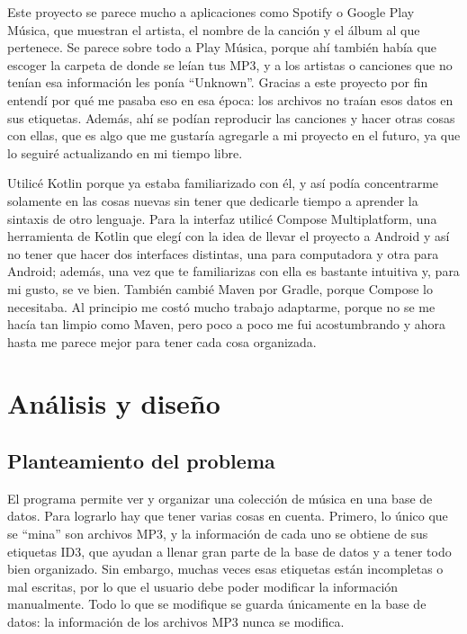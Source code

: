 \documentclass[12pt,letterpaper]{article}
\begin{document}
Este proyecto se parece mucho a aplicaciones como Spotify o Google Play
Música, que muestran el artista, el nombre de la canción y el álbum al que
pertenece. Se parece sobre todo a Play Música, porque ahí también había
que escoger la carpeta de donde se leían tus MP3, y a los artistas o
canciones que no tenían esa información les ponía ``Unknown''. Gracias a
este proyecto por fin entendí por qué me pasaba eso en esa época: los
archivos no traían esos datos en sus etiquetas. Además, ahí se podían
reproducir las canciones y hacer otras cosas con ellas, que es algo que me
gustaría agregarle a mi proyecto en el futuro, ya que lo seguiré
actualizando en mi tiempo libre.

Utilicé Kotlin porque ya estaba familiarizado con él, y así podía
concentrarme solamente en las cosas nuevas sin tener que dedicarle tiempo
a aprender la sintaxis de otro lenguaje. Para la interfaz utilicé Compose
Multiplatform, una herramienta de Kotlin que elegí con la idea de llevar
el proyecto a Android y así no tener que hacer dos interfaces distintas,
una para computadora y otra para Android; además, una vez que te
familiarizas con ella es bastante intuitiva y, para mi gusto, se ve bien.
También cambié Maven por Gradle, porque Compose lo necesitaba. Al
principio me costó mucho trabajo adaptarme, porque no se me hacía tan
limpio como Maven, pero poco a poco me fui acostumbrando y ahora hasta me
parece mejor para tener cada cosa organizada.

\section{Análisis y diseño}

\subsection{Planteamiento del problema}

El programa permite ver y organizar una colección de música en una base de
datos. Para lograrlo hay que tener varias cosas en cuenta. Primero, lo
único que se ``mina'' son archivos MP3, y la información de cada uno se
obtiene de sus etiquetas ID3, que ayudan a llenar gran parte de la base de
datos y a tener todo bien organizado. Sin embargo, muchas veces esas
etiquetas están incompletas o mal escritas, por lo que el usuario debe
poder modificar la información manualmente. Todo lo que se modifique se
guarda únicamente en la base de datos: la información de los archivos MP3
nunca se modifica.
\end{document}
